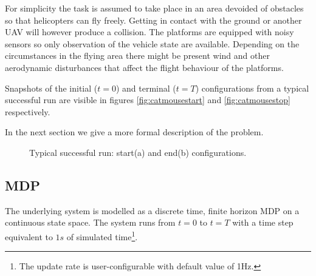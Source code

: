 \documentclass[a4paper,11pt]{report}
\begin{document}
For simplicity the task is assumed to take place in an area devoided of obstacles so that helicopters can fly freely. Getting in contact with the ground or another UAV will however produce a collision.
The platforms are equipped with noisy sensors so only observation of the vehicle state are available.  
Depending on the circumstances in the flying area there might be present wind and other aerodynamic disturbances that affect the flight behaviour of the platforms.

Snapshots of the initial ($t=0$) and terminal ($t=T$) configurations from a typical successful run are visible in figures \ref{fig:catmousestart} and \ref{fig:catmousestop} respectively. 

In the next section we give a more formal description of the problem.

\begin{figure}[ht]
\centering
{}
\caption{Typical successful run: start(a) and end(b) configurations. \label{fig:catmouse}}
\end{figure}

\subsection{MDP}

The underlying system is modelled as a discrete time, finite horizon MDP on a continuous state space. The system runs from $t=0$ to $t=T$ with a time step equivalent to $1s$ of simulated time\footnote{The update rate is user-configurable with default value of 1Hz.}. 
\end{document}
